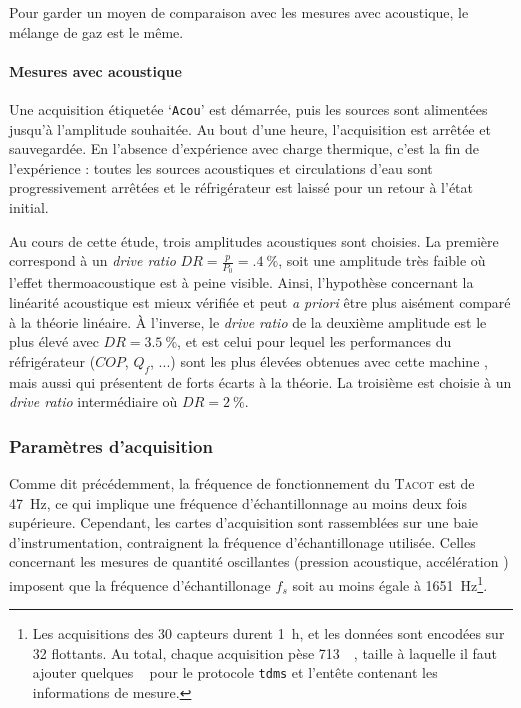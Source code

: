 Pour garder un moyen de comparaison avec les mesures avec acoustique, le mélange de gaz est le même.

\paragraph{Mesures avec acoustique}\label{chap:MesureAvecAcou} 
Une acquisition étiquetée `\texttt{Acou}' est démarrée, puis les sources sont alimentées jusqu'à l'amplitude souhaitée. Au bout d'une heure, l'acquisition est arrêtée et sauvegardée. En l'absence d'expérience avec charge thermique, c'est la fin de l'expérience : toutes les sources acoustiques et circulations d'eau sont progressivement arrêtées et le réfrigérateur est laissé pour un retour à l'état initial.

Au cours de cette étude, trois amplitudes acoustiques sont choisies. La première correspond à un \textit{drive ratio} $DR=\frac{p}{P_0}=\qty{.4}{\percent}$, soit une amplitude très faible où l'effet thermoacoustique est à peine visible. Ainsi, l'hypothèse concernant la linéarité acoustique est mieux vérifiée et peut \textit{a priori} être plus aisément comparé à la théorie linéaire. À l'inverse, le \textit{drive ratio} de la deuxième amplitude est le plus élevé avec $DR=\qty{3.5}{\percent}$, et est celui pour lequel les performances du réfrigérateur ($COP$, $Q_f$, ...) sont les plus élevées obtenues avec cette machine \cite{ramadan_design_2021}, mais aussi qui présentent de forts écarts à la théorie. La troisième est choisie à un \textit{drive ratio} intermédiaire où $DR=\qty{2}{\percent}$. 




\subsubsection{Paramètres d'acquisition}
Comme dit précédemment, la fréquence de fonctionnement du \textsc{Tacot} est de \qty{47}{\hertz}, ce qui implique une fréquence d'échantillonnage au moins deux fois supérieure. Cependant, les cartes d'acquisition sont rassemblées sur une baie d'instrumentation, contraignent la fréquence d'échantillonage utilisée. Celles concernant les mesures de quantité oscillantes (pression acoustique, accélération ) imposent que la fréquence d'échantillonage $f_s$ soit au moins égale à \qty{1651}{\Hz}\footnote{Les acquisitions des \num{30} capteurs durent \qty{1}{\hour}, et les données sont encodées sur \qty{32}{\bit} flottants. Au total, chaque acquisition pèse \qty{713}{\mega\byte}, taille à laquelle il faut ajouter quelques \unit{\mega\byte} pour le protocole \texttt{tdms} et l'entête contenant les informations de mesure.}.


